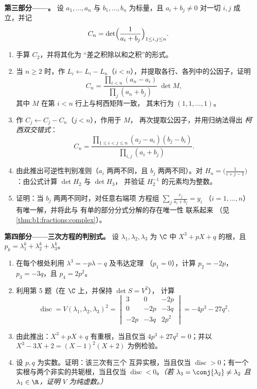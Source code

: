 \begin{problem}
\medskip
\noindent\textbf{第三部分——。} 设 $a_1,
\dots, a_n$ 与 $b_1, \dots, b_n$ 为标量，且 $a_i + b_j
\neq 0$ 对一切 $i, j$ 成立，并记
\[
C_n = \det\Bigl(\frac{1}{a_i + b_j}\Bigr)_{1 \leq i, j \leq n} .
\]
\begin{enumerate}[resume]
  \item 手算 $C_2$，并将其化为
        “差之积除以和之积”的形式。
  \item 当 $n \geq 2$ 时，作 $L_i \leftarrow L_i - L_n$（$i <
        n$），并提取各行、各列中的公因子，证明
        \[
        C_n = \frac{\prod_{i<n}(a_n - a_i)}{\prod_{j}(a_n +
        b_j)}\;\det M,
        \]
        其中 $M$ 在第 $i < n$ 行上与柯西矩阵一致，
        其末行为 $(1, 1, \dots, 1)$。
  \item 作 $C_j \leftarrow C_j - C_n$（$j < n$），作用于 $M$，
        再次提取公因子，并用归纳法得出
        \emph{柯西双交错式}：
        \[
        C_n = \frac{\prod_{1 \leq i < j \leq n}(a_j - a_i)(b_j -
        b_i)}{\prod_{i, j}(a_i + b_j)} .
        \]
  \item 由此推出可逆性判别准则（$a_i$ 两两不同，且
        $b_j$ 两两不同）。对
        \emph{} $H_n = \bigl(\frac{1}{i + j -
        1}\bigr)$：由公式计算 $\det H_2$ 与 $\det H_3$，
        并验证 $H_2^{-1}$ 的元素均为整数。
  \item 证明：当 $b_j$ 两两不同时，对任意右端项
        方程组 $\sum_j \frac{c_j}{a_i + b_j} = y_i$
        （$i = 1, \dots, n$）有唯一解，并将此与
        有单的部分分式分解的存在唯一性
        联系起来
        （见\cref{thm:b1:fractions:complex}）。
\end{enumerate}

\medskip
\noindent\textbf{第四部分——三次方程的判别式。}
设 $\lambda_1, \lambda_2, \lambda_3$ 为 $\C$ 中 $X^3
+ pX + q$ 的根，且 $p_k = \lambda_1^k + \lambda_2^k + \lambda_3^k$。
\begin{enumerate}[resume]
  \item 在每个根处利用 $\lambda^3 = -p\lambda - q$ 及韦达定理
        （$p_1 = 0$），计算 $p_2 = -2p$，$p_3 = -3q$，且
        $p_4 = 2p^2$。
  \item 利用第 5 题（在 $\C$ 上，并保持 $\det S = V^2$），
        计算
        \[
        \operatorname{disc} = V(\lambda_1, \lambda_2,
        \lambda_3)^2 = \begin{vmatrix}
        3 & 0 & -2p\\
        0 & -2p & -3q\\
        -2p & -3q & 2p^2
        \end{vmatrix}
        = -4p^3 - 27q^2 .
        \]
  \item 由此推出：$X^3 + pX + q$ 有重根，当且仅当
        $4p^3 + 27q^2 = 0$；并以 $X^3 - 3X + 2 = (X -
        1)^2(X + 2)$ 为例检验。
  \item 设 $p, q$ 为实数。证明：该三次有三个
        互异实根，当且仅当 $\operatorname{disc}
        > 0$；有一个实根与两个非实的共轭根，当且仅当
        $\operatorname{disc} < 0$。\emph{（若
        $\lambda_3 = \conj{\lambda_2} \neq \lambda_2$ 且
        $\lambda_1 \in \R$，证明 $V$ 为纯虚数。）}
\end{enumerate}


\end{problem}
